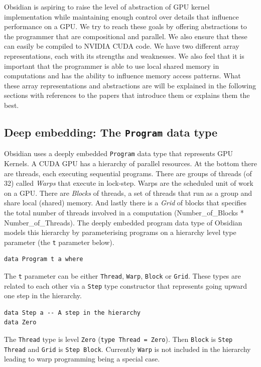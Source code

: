 \documentclass[a4paper]{book}
\begin{document}
Obsidian is aspiring to raise the level of abstraction of GPU kernel implementation 
while maintaining enough control over details that influence performance on a GPU. 
We try to reach these goals by offering abstractions to the programmer that are 
compositional and parallel. We also ensure that these can easily be compiled 
to NVIDIA CUDA code. We have two different array representations, each with 
its strengths and weaknesses. We also feel that it is important that the programmer 
is able to use local shared memory in computations and has the ability to influence 
memory access patterns. What these array representations and abstractions are 
will be explained in the following sections with references to the papers 
that introduce them or explains them the best. 


\subsection{Deep embedding: The {\tt Program} data type}

Obsidian uses a deeply embedded {\tt Program} data type that represents GPU Kernels. 
A CUDA GPU has a hierarchy of parallel resources. At the bottom there are threads, each 
executing sequential programs. There are groups of threads (of 32) called {\em Warps} that 
execute in lock-step. Warps are the scheduled unit of work on a GPU. There are {\em Blocks} 
of threads, a set of threads that run as a group and share local (shared) memory. And 
lastly there is a {\em Grid} of blocks that specifies the total number of threads involved 
in a computation (Number\_of\_Blocks * Number\_of\_Threads). The deeply embedded program 
data type of Obsidian models this hierarchy by parameterising programs on a hierarchy 
level type parameter (the  {\tt t} parameter below).

\begin{verbatim} 
data Program t a where
\end{verbatim}

The {\tt t} parameter can be either {\tt Thread}, {\tt Warp}, {\tt Block} or {\tt Grid}.
These types are related to each other via a {\tt Step} type constructor that represents 
going upward one step in the hierarchy. 

\begin{verbatim} 
data Step a -- A step in the hierarchy
data Zero
\end{verbatim} 

The {\tt Thread} type is level {\tt Zero} ({\tt type Thread = Zero}). Then {\tt Block} is 
{\tt Step Thread} and {\tt Grid} is {\tt Step Block}. Currently {\tt Warp} is not included 
in the hierarchy leading to warp programming being a special case. 
\end{document}
